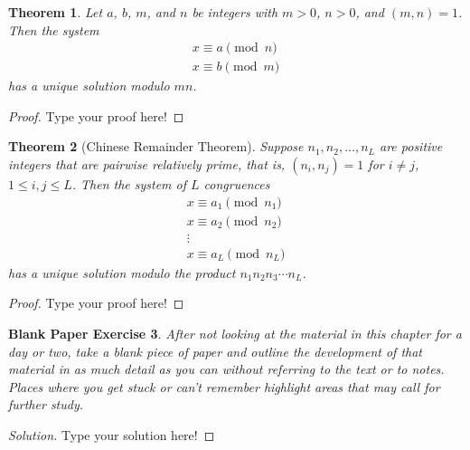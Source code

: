 \documentclass[11pt,leqno]{article}
\newtheorem{thm}{Theorem}[section]
\newtheorem{bpe}[thm]{Blank Paper Exercise}
\theoremstyle{definition}
\begin{document}
\begin{thm}
Let $a$, $b$, $m$, and $n$ be integers with $m > 0$, $n > 0$, and
$(m,n)=1$.  Then the system
\[ \begin{array}{l}
x \equiv a \pmod{n} \\
x \equiv b \pmod{m} \end{array} \] has a unique solution modulo
$mn$.
\end{thm}

\begin{proof}[Proof]
Type your proof here!
\end{proof}


\begin{thm}[Chinese Remainder Theorem]
Suppose $n_1, n_2, \hdots, n_L$ are positive integers that are
pairwise relatively prime, that is, $(n_i, n_j)=1$ for $i\neq j$,
$1\leq i, j \leq L$.  Then the system of $L$ congruences
\[ \begin{array}{c}
x \equiv a_1 \pmod{n_1} \\
x \equiv a_2 \pmod{n_2} \\
\vdots \\
x \equiv a_L \pmod{n_L} \end{array} \] has a unique solution modulo
the product $n_1 n_2  n_3 \cdots n_L$.
\end{thm}

\begin{proof}[Proof]
Type your proof here!
\end{proof}


\begin{bpe}
After not looking at the material in this chapter for a day or two,
take a blank piece of paper and outline the development of that
material in as much detail as you can without referring to the text
or to notes. Places where you get stuck or can't remember highlight
areas that may call for further study.
\end{bpe}

\begin{proof}[Solution]
Type your solution here!
\end{proof}
\end{document}
